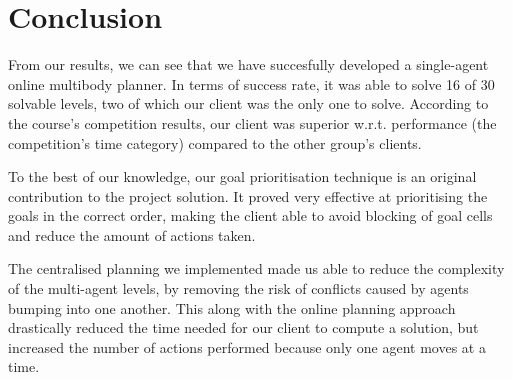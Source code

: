 \section{Conclusion}
\label{sec:conclusion}

From our results, we can see that we have succesfully developed a single-agent online multibody planner.
In terms of success rate, it was able to solve 16 of 30 solvable levels, two of which our client was the only one to solve.
According to the course's competition results, our client was superior w.r.t. performance (the competition's time category) compared to the other group's clients.

To the best of our knowledge, our goal prioritisation technique is an original contribution to the project solution. 
It proved very effective at prioritising the goals in the correct order, making the client able to avoid blocking of goal cells and reduce the amount of actions taken.

The centralised planning we implemented made us able to reduce the complexity of the multi-agent levels, by removing the risk of conflicts caused by agents bumping into one another.
This along with the online planning approach drastically reduced the time needed for our client to compute a solution, but increased the number of actions performed because only one agent moves at a time.


